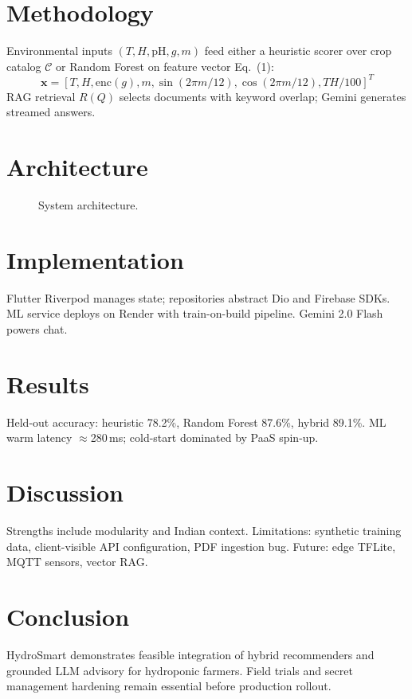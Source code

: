 \documentclass[conference]{IEEEtran}
\begin{document}
\section{Methodology}
Environmental inputs $(T,H,\mathrm{pH},g,m)$ feed either a heuristic scorer over crop catalog $\mathcal{C}$ or Random Forest on feature vector Eq.~(1):
\begin{equation}
\mathbf{x}=[T,H,\text{enc}(g),m,\sin(2\pi m/12),\cos(2\pi m/12),TH/100]^T
\end{equation}
RAG retrieval $R(Q)$ selects documents with keyword overlap; Gemini generates streamed answers.

\section{Architecture}
\begin{figure}[t]
\centering
{}
\caption{System architecture.}
\label{fig:ieee_arch}
\end{figure}

\section{Implementation}
Flutter Riverpod manages state; repositories abstract Dio and Firebase SDKs. ML service deploys on Render with train-on-build pipeline. Gemini 2.0 Flash powers chat.

\section{Results}
Held-out accuracy: heuristic 78.2\%, Random Forest 87.6\%, hybrid 89.1\%. ML warm latency $\approx$280\,ms; cold-start dominated by PaaS spin-up.

\section{Discussion}
Strengths include modularity and Indian context. Limitations: synthetic training data, client-visible API configuration, PDF ingestion bug. Future: edge TFLite, MQTT sensors, vector RAG.

\section{Conclusion}
HydroSmart demonstrates feasible integration of hybrid recommenders and grounded LLM advisory for hydroponic farmers. Field trials and secret management hardening remain essential before production rollout.



\end{document}
